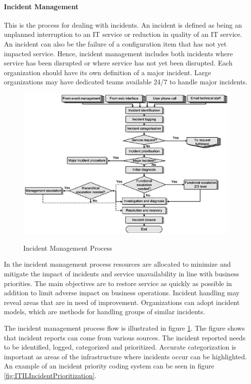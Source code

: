 \paragraph{Incident Management}
This is the process for dealing with incidents. An incident is defined as being an unplanned interruption to an IT service or reduction in quality of an IT service. An incident can also be the failure of a configuration item that has not yet impacted service. Hence, incident management includes both incidents where service has been disrupted or where service has not yet been disrupted. Each organization should have its own definition of a major incident. Large organizations may have dedicated teams available 24/7 to handle major incidents. 

\begin{figure}
\centering
\scalebox{0.45}
{\includegraphics{ITILIncidentManagement.png}}
\caption[The ITIL Incident Management Process]{Incident Management Process \cite{itilbok}} 
\label{fig:ITILIncidentManagement}
\end{figure}

\pagebreak
In the incident management process resources are allocated to minimize and mitigate the impact of incidents and service unavailability in line with business priorities. The main objectives are to restore service as quickly as possible in addition to limit adverse impact on business operations. Incident handling may reveal areas that are in need of improvement. Organizations can adopt incident models, which are methods for handling groups of similar incidents.

The incident management process flow is illustrated in figure \ref{fig:ITILIncidentManagement}. The figure shows that incident reports can come from various sources. The incident reported needs to be identified, logged, categorized and prioritized. Accurate categorization is important as areas of the infrastructure where incidents occur can be highlighted. An example of an incident priority coding system can be seen in figure \ref{fig:ITILIncidentPrioritization}.

